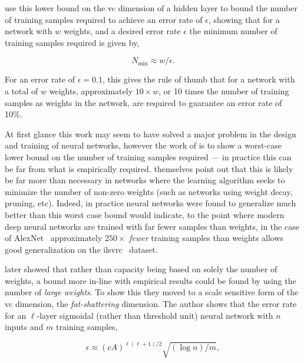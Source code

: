 \documentclass[thesis]{subfiles}
\begin{document}
    \citet{baum1989size} use this lower bound on the \gls{vc} dimension of a hidden layer to bound the number of training samples required to achieve an error rate of $\epsilon$, showing that for a network with $w$ weights, and a desired error rate $\epsilon$ the minimum number of training samples required is given by,
    
    \begin{equation}
        N_{\min} \approx w/\epsilon.
    \end{equation}
    
    For an error rate of $\epsilon=0.1$, this gives the rule of thumb that for a network with a total of $w$ weights, approximately $10\times w$, or 10 times the number of training samples as weights in the network, are required to guarantee an error rate of 10\%. 
    
    At first glance this work may seem to have solved a major problem in the design and training of neural networks, however the work of \citet{baum1989size} is to show a worst-case lower bound on the number of training samples required --- in practice this can be far from what is empirically required. \citet{baum1989size} themselves point out that this is likely be far more than necessary in networks where the learning algorithm seeks to minimize the number of non-zero weights (such as networks using weight decay, pruning, etc). Indeed, in practice neural networks were found to generalize much better than this worst case bound would indicate, to the point where modern deep neural networks are trained with far fewer samples than weights, in the case of AlexNet~\citep{Krizhevsky2012} approximately $250\times$ \emph{fewer} training samples than weights allows good generalization on the \gls{ilsvrc}~\citep{ILSVRC2015} dataset.
    
    \citet{bartlett1997} later showed that rather than capacity being based on solely the number of weights, a bound more in-line with empirical results could be found by using the number of \emph{large weights}. To show this they moved to a scale sensitive form of the \gls{vc} dimension, the \emph{fat-shattering} dimension. The author shows that the error rate for an $\ell$-layer sigmoidal (rather than threshold unit) neural network with $n$ inputs and $m$ training samples,
    
    \begin{equation}
        \epsilon \approx (cA)^{\ell(\ell+1)/2} \sqrt{(\log n)/m},
    \end{equation}
    
\end{document}
